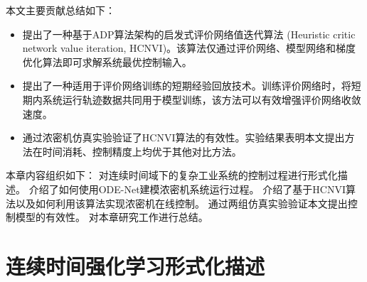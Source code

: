 
本文主要贡献总结如下：
\begin{itemize}
\item  提出了一种基于ADP算法架构的启发式评价网络值迭代算法
(Heuristic critic network value iteration,
HCNVI)。该算法仅通过评价网络、模型网络和梯度优化算法即可求解系统最优控制输入。
\item  提出了一种适用于评价网络训练的短期经验回放技术。训练评价网络时，将短期内系统运行轨迹数据共同用于模型训练，该方法可以有效增强评价网络收敛速度。
\item  通过浓密机仿真实验验证了HCNVI算法的有效性。实验结果表明本文提出方法在时间消耗、控制精度上均优于其他对比方法。
\end{itemize}

本章内容组织如下： 
对连续时间域下的复杂工业系统的控制过程进行形式化描述。
介绍了如何使用ODE-Net建模浓密机系统运行过程。
介绍了基于HCNVI算法以及如何利用该算法实现浓密机在线控制。
通过两组仿真实验验证本文提出控制模型的有效性。
对本章研究工作进行总结。

\section{连续时间强化学习形式化描述}
\label{sec:formulation}

